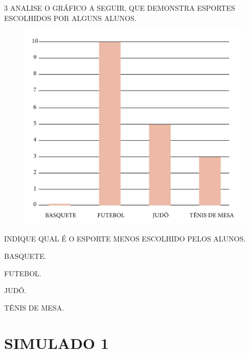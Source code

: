 \num{3} ANALISE O GRÁFICO A SEGUIR, QUE DEMONSTRA ESPORTES ESCOLHIDOS POR ALGUNS ALUNOS.

\begin{figure}[htpb!]
\includegraphics[width=\textwidth]{../ilustracoes/MAT1/SAEB_1ANO_MAT_FIGURA111.png}
\end{figure}

INDIQUE QUAL É O ESPORTE MENOS ESCOLHIDO PELOS ALUNOS.

\begin{minipage}{.5\textwidth}
\begin{escolha}
\item BASQUETE.

\item FUTEBOL.

\item JUDÔ.

\item TÊNIS DE MESA.
\end{escolha}
\end{minipage}

\chapter{SIMULADO 1}

